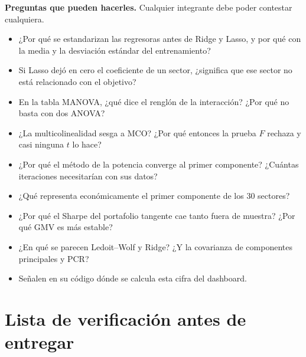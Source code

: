 \documentclass[10pt,letterpaper]{article}
\begin{document}
\textbf{Preguntas que pueden hacerles.} Cualquier integrante debe poder contestar cualquiera.
\begin{itemize}
  \item ¿Por qué se estandarizan las regresoras antes de Ridge y Lasso, y por qué con la media y la desviación estándar del entrenamiento?
  \item Si Lasso dejó en cero el coeficiente de un sector, ¿significa que ese sector no está relacionado con el objetivo?
  \item En la tabla MANOVA, ¿qué dice el renglón de la interacción? ¿Por qué no basta con dos ANOVA?
  \item ¿La multicolinealidad sesga a MCO? ¿Por qué entonces la prueba $F$ rechaza y casi ninguna $t$ lo hace?
  \item ¿Por qué el método de la potencia converge al primer componente? ¿Cuántas iteraciones necesitarían con sus datos?
  \item ¿Qué representa económicamente el primer componente de los 30 sectores?
  \item ¿Por qué el Sharpe del portafolio tangente cae tanto fuera de muestra? ¿Por qué GMV es más estable?
  \item ¿En qué se parecen Ledoit--Wolf y Ridge? ¿Y la covarianza de componentes principales y PCR?
  \item Señalen en su código dónde se calcula esta cifra del dashboard.
\end{itemize}

\section*{Lista de verificación antes de entregar}
\end{document}
